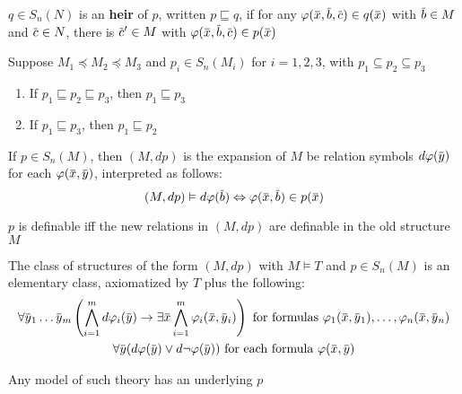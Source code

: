 \documentclass[11pt]{article}
\begin{document}
\begin{definition}[Heirs]
\(q\in S_n(N)\) is an \textbf{heir} of \(p\), written \(p\sqsubseteq q\), if for
any \(\varphi(\barx,\barb,\barc)\in q(\barx)\) with \(\barb\in M\) and \(\barc\in N\), there
is \(\barc'\in M\) with \(\varphi(\barx,\barb,\barc)\in p(\barx)\)
\end{definition}

\begin{lemma}[]
Suppose \(M_1\preceq M_2\preceq M_3\) and \(p_i\in S_n(M_i)\) for \(i=1,2,3\), with \(p_1\subseteq p_2\subseteq p_3\)
\begin{enumerate}
\item If \(p_1\sqsubseteq p_2\sqsubseteq p_3\), then \(p_1\sqsubseteq p_3\)
\item If \(p_1\sqsubseteq p_3\), then \(p_1\sqsubseteq p_2\)
\end{enumerate}
\end{lemma}

\begin{definition}[]
If \(p\in S_n(M)\), then \((M,dp)\) is the expansion of \(M\) be relation symbols \(d\varphi(\bary)\)
for each \(\varphi(\barx,\bary)\), interpreted as follows:
\begin{equation*}
(M,dp)\vDash d\varphi(\barb)\Leftrightarrow\varphi(\barx,\barb)\in p(\barx)
\end{equation*}
\end{definition}

\begin{remark}
\(p\) is definable iff the new relations in \((M,dp)\) are definable in the old structure \(M\)
\end{remark}

\begin{remark}
The class of structures of the form \((M,dp)\) with \(M\vDash T\) and \(p\in S_n(M)\) is an elementary
class, axiomatized by \(T\) plus the following:
\begin{gather*}
\forall\bary_1\dots\bary_m\left( \bigwedge_{i=1}^md\varphi_i(\bary)\to\exists\barx\bigwedge_{i=1}^m\varphi_i(\barx,\bary_i) \right)
\text{ for formulas }\varphi_1(\barx,\bary_1),\dots,\varphi_n(\barx,\bary_n)\\
\forall\bary(d\varphi(\bary)\vee d\neg\varphi(\bary))\text{ for each formula }\varphi(\barx,\bary)
\end{gather*}

Any model of such theory has an underlying \(p\)
\end{remark}
\end{document}
